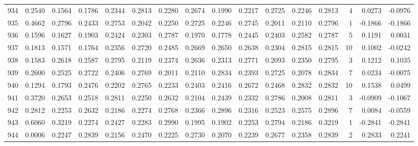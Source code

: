 \begin{tabular}{lrrrrrrrrrrrrrrr}
934 &      0.2540 &  0.1564 &  0.1786 &  0.2344 &  0.2813 &  0.2280 &  0.2674 &  0.1990 &  0.2217 &  0.2725 &   0.2246 &     0.2813 &      4 &                    0.0273 &                    -0.0976 \\
935 &      0.4662 &  0.2796 &  0.2433 &  0.2753 &  0.2042 &  0.2250 &  0.2725 &  0.2246 &  0.2745 &  0.2011 &   0.2110 &     0.2796 &      1 &                   -0.1866 &                    -0.1866 \\
936 &      0.1596 &  0.1627 &  0.1903 &  0.2424 &  0.2303 &  0.2787 &  0.1970 &  0.1778 &  0.2445 &  0.2403 &   0.2582 &     0.2787 &      5 &                    0.1191 &                     0.0031 \\
937 &      0.1813 &  0.1571 &  0.1764 &  0.2356 &  0.2720 &  0.2485 &  0.2669 &  0.2650 &  0.2638 &  0.2304 &   0.2815 &     0.2815 &     10 &                    0.1002 &                    -0.0242 \\
938 &      0.1583 &  0.2618 &  0.2587 &  0.2795 &  0.2119 &  0.2374 &  0.2636 &  0.2313 &  0.2771 &  0.2093 &   0.2350 &     0.2795 &      3 &                    0.1212 &                     0.1035 \\
939 &      0.2600 &  0.2525 &  0.2722 &  0.2406 &  0.2769 &  0.2011 &  0.2110 &  0.2834 &  0.2393 &  0.2725 &   0.2078 &     0.2834 &      7 &                    0.0234 &                    -0.0075 \\
940 &      0.1294 &  0.1793 &  0.2476 &  0.2202 &  0.2765 &  0.2233 &  0.2403 &  0.2416 &  0.2672 &  0.2468 &   0.2832 &     0.2832 &     10 &                    0.1538 &                     0.0499 \\
941 &      0.3720 &  0.2653 &  0.2518 &  0.2811 &  0.2250 &  0.2632 &  0.2104 &  0.2439 &  0.2332 &  0.2786 &   0.2008 &     0.2811 &      3 &                   -0.0909 &                    -0.1067 \\
942 &      0.2812 &  0.2253 &  0.2632 &  0.2186 &  0.2274 &  0.2768 &  0.2366 &  0.2896 &  0.2316 &  0.2523 &   0.2575 &     0.2896 &      7 &                    0.0084 &                    -0.0559 \\
943 &      0.6060 &  0.3219 &  0.2274 &  0.2427 &  0.2283 &  0.2990 &  0.1995 &  0.1902 &  0.2253 &  0.2794 &   0.2186 &     0.3219 &      1 &                   -0.2841 &                    -0.2841 \\
944 &      0.0006 &  0.2247 &  0.2839 &  0.2156 &  0.2470 &  0.2225 &  0.2730 &  0.2070 &  0.2239 &  0.2677 &   0.2358 &     0.2839 &      2 &                    0.2833 &                     0.2241 \\

\end{tabular}
